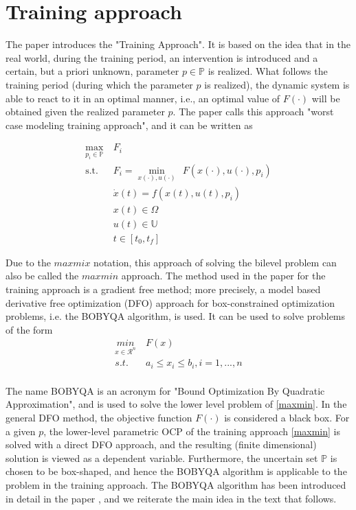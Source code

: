 \documentclass  [
  paper    = a4,
  BCOR     = 10mm,
  twoside,
  fontsize = 12pt,
  fleqn,
  toc      = bibnumbered,
  toc      = listofnumbered,
  numbers  = noendperiod,
  headings = normal,
  listof   = leveldown,
  version  = 3.03
]                                       {scrreprt}
\newcommand{\<}{\langle}
\renewcommand{\>}{\rangle}
\begin{document}
\section{Training approach}
The paper \cite{MatSch22} introduces the "Training Approach". It is based on the idea that in the real world, during the training period, an intervention is introduced and a certain, but a priori unknown, parameter $p \in \mathbb{P}$ is realized. What follows the training period (during which the parameter $p$ is realized), the dynamic system is able to react to it in an optimal manner, i.e., an optimal value of $ F(\cdot)$ will be obtained given the realized parameter $p$. The paper \cite{MatSch22} calls this approach "worst case modeling training approach", and it can be written as


\begin{equation}
	\begin{aligned}
		\underset{p_i \in \mathbb{P}}{\max} \ & F_i \\
		\text{s.t.}\ \ & F_i = \underset{x(\cdot), u(\cdot)}{\min} \ \ F(x(\cdot), u(\cdot), p_i) \\
		& \dot{x} (t) = f(x(t), u(t), p_i)\\
		& x(t) \in \Omega \\
		& u(t) \in \mathbb{U} \\
		& t \in [t_0, t_f]
	\end{aligned}
	\label{maxmin}
\end{equation}


Due to the $max mix$ notation, this approach of solving the bilevel problem can also be called the $max min$ approach. The method used in the paper \cite{MatSch22} for the training approach is a gradient free method; more precisely, a model based derivative free optimization (DFO) approach for box-constrained optimization problems, i.e. the BOBYQA algorithm, is used. It can be used to solve problems of the form
\begin{equation}
	\begin{aligned}
		\underset{x \in \mathcal{R}^n}{min} & \  F(x)  \\ 
		s.t.  & \ a_i \leq x_i \leq b_i, i = 1, ..., n \\
	\end{aligned}
	\label{DFO_bc}
\end{equation}

The name BOBYQA is an acronym for "Bound Optimization By Quadratic Approximation", and is used to solve the lower level problem of \ref{maxmin}. In the general DFO method, the objective function $F(\cdot)$ is considered a black box. For a given $p$, the lower-level parametric OCP of the training approach \ref{maxmin} is solved with a direct DFO approach, and the resulting (finite dimensional) solution is viewed as a dependent variable. Furthermore, the uncertain set $\mathbb{P}$ is chosen to be box-shaped, and hence the BOBYQA algorithm is applicable to the problem in the training approach. The BOBYQA algorithm has been introduced in detail in the paper \cite{MicPow09}, and we reiterate the main idea in the text that follows.
\end{document}
